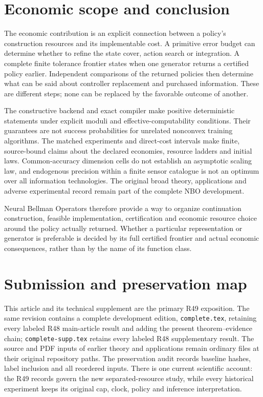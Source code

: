 \documentclass[ecta,nameyear,draft]{econsocart}
\begin{document}





\section{Economic scope and conclusion}\label{sec:conclusion49}
The economic contribution is an explicit connection between a policy's construction resources and its implementable cost. A primitive error budget can determine whether to refine the state cover, action search or integration. A complete finite tolerance frontier states when one generator returns a certified policy earlier. Independent comparisons of the returned policies then determine what can be said about controller replacement and purchased information. These are different steps; none can be replaced by the favorable outcome of another.

The constructive backend and exact compiler make positive deterministic statements under explicit moduli and effective-computability conditions. Their guarantees are not success probabilities for unrelated nonconvex training algorithms. The matched experiments and direct-cost intervals make finite, source-bound claims about the declared economies, resource ladders and initial laws. Common-accuracy dimension cells do not establish an asymptotic scaling law, and endogenous precision within a finite sensor catalogue is not an optimum over all information technologies. The original broad theory, applications and adverse experimental record remain part of the complete NBO development.

Neural Bellman Operators therefore provide a way to organize continuation construction, feasible implementation, certification and economic resource choice around the policy actually returned. Whether a particular representation or generator is preferable is decided by its full certified frontier and actual economic consequences, rather than by the name of its function class.

\appendix
\section{Submission and preservation map}\label{sec:map49}
This article and its technical supplement are the primary R49 exposition. The same revision contains a complete development edition, \texttt{complete.tex}, retaining every labeled R48 main-article result and adding the present theorem--evidence chain; \texttt{complete-supp.tex} retains every labeled R48 supplementary result. The source and PDF inputs of earlier theory and applications remain ordinary files at their original repository paths. The preservation audit records baseline hashes, label inclusion and all reordered inputs. There is one current scientific account: the R49 records govern the new separated-resource study, while every historical experiment keeps its original cap, clock, policy and inference interpretation.
\end{document}
